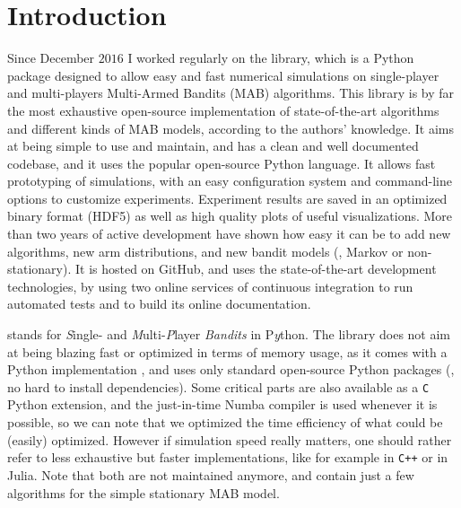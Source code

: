 \minitocStartChapter{}

\section{Introduction}
\label{sec:3:Introduction}



Since December $2016$ I worked regularly on the \SMPyBandits{} library, which is a Python package  designed to allow easy and fast numerical simulations on single-player and multi-players Multi-Armed Bandits (MAB) algorithms.
%
This library is by far the most exhaustive open-source implementation of state-of-the-art algorithms and different kinds of MAB models, according to the authors' knowledge.
It aims at being simple to use and maintain, and has a clean and well documented codebase, and it uses the popular open-source Python language.
It allows fast prototyping of simulations, with an easy configuration system and command-line options to customize experiments.
Experiment results are saved in an optimized binary format (HDF5) as well as high quality plots of useful visualizations.
%
More than two years of active development have shown how easy it can be to add new algorithms, new arm distributions, and new bandit models (\eg, Markov or non-stationary).
It is hosted on GitHub, and uses the state-of-the-art development technologies, by using two online services of continuous integration to run automated tests and to build its online documentation.

\SMPyBandits{} stands for \emph{S}ingle- and \emph{M}ulti-\emph{P}layer \emph{Bandits} in P\emph{y}thon.
The library does not aim at being blazing fast or optimized in terms of memory usage, as it comes with a Python implementation \cite{python}, and uses only standard open-source Python packages (\ie, no hard to install dependencies).
Some critical parts are also available as a \texttt{C} Python extension, and the just-in-time Numba compiler \cite{numba} is used whenever it is possible, so we can note that we optimized the time efficiency of what could be (easily) optimized.
However if simulation speed really matters, one should rather refer to less exhaustive but faster implementations, like for example \cite{TorLibbandit} in \texttt{C++} or \cite{VishMABjl} in Julia. Note that both are not maintained anymore, and contain just a few algorithms for the simple stationary MAB model.


